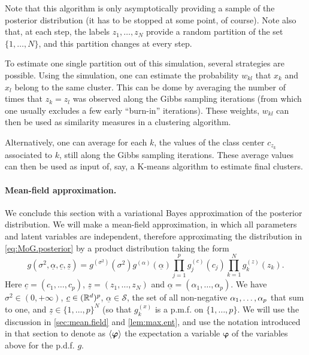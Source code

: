 Note that this algorithm is only asymptotically providing a sample of the posterior distribution (it has to be stopped at some point, of course). Note also that, at each step, the labels $z_1, \ldots, z_N$ provide a random partition of the set $\{1, \ldots, N\}$, and this partition changes at every step. 

To estimate one single partition out of this simulation, several strategies are possible. Using the simulation, one can estimate the probability $w_{kl}$ that $x_k$ and $x_l$ belong to the same cluster. This can be dome by averaging the number of times that $z_k = z_l$ was observed along the Gibbs sampling iterations (from which one usually excludes a few early ``burn-in'' iterations). These weights, $w_{kl}$ can then be used as similarity measures in a clustering algorithm.

Alternatively, one can average for each $k$, the values of the class center $c_{z_k}$ associated to $k$, still along the Gibbs sampling iterations. These average values can then be used as input of, say, a K-means algorithm to estimate final clusters.

\paragraph{Mean-field approximation.}
We conclude this section with a variational Bayes approximation of the posterior distribution. We will make a mean-field approximation, in which all parameters and latent variables are independent, therefore approximating the distribution in \cref{eq:MoG.posterior} by a product distribution taking the form
\[ g(\sigma^2, \underline\alpha, \underline c, \underline z) = 
g^{(\sigma^2)}(\sigma^2) g^{(\alpha)}(\underline \alpha) \prod_{j=1}^p g^{(c)}_j(c_j)\prod_{k=1}^N g^{(z)}_k(z_k).
\]
Here $\underline c = (c_1, \ldots, c_p)$, $\underline z = (z_1, \ldots, z_N)$ and $\underline\alpha = (\alpha_1, \ldots, \alpha_p)$. We have $\sigma^2 \in (0, +\infty)$, $\underline c \in ({\mathbb{R}}^{d})^p$, $\underline\alpha\in \mathcal S$, the set of all non-negative $\alpha_1, \ldots, \alpha_p$ that sum to one, and $\underline z\in \{1, \ldots, p\}^N$ (so that $g_k^{(x)}$ is a p.m.f. on $\{1, \ldots, p\}$.  We will use the discussion in \cref{sec:mean.field} and \cref{lem:max.ent}, and use the notation introduced in that section to denote as  $\left\langle\bm{\varphi}\right\rangle$ the expectation a variable $\boldsymbol\varphi$ of the variables above for the p.d.f. $g$.

